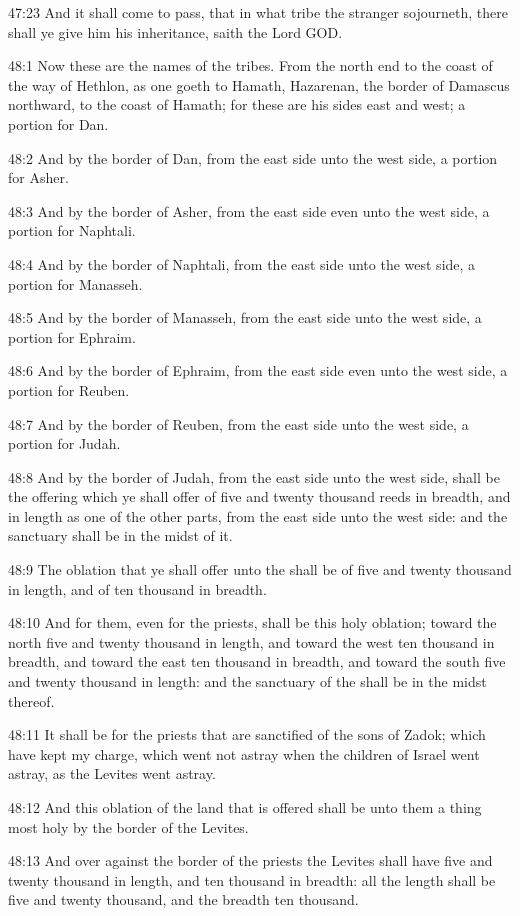 47:23 And it shall come to pass, that in what tribe the stranger sojourneth, there shall ye give him his inheritance, saith the Lord GOD.

48:1 Now these are the names of the tribes. From the north end to the coast of the way of Hethlon, as one goeth to Hamath, Hazarenan, the border of Damascus northward, to the coast of Hamath; for these are his sides east and west; a portion for Dan.

48:2 And by the border of Dan, from the east side unto the west side, a portion for Asher.

48:3 And by the border of Asher, from the east side even unto the west side, a portion for Naphtali.

48:4 And by the border of Naphtali, from the east side unto the west side, a portion for Manasseh.

48:5 And by the border of Manasseh, from the east side unto the west side, a portion for Ephraim.

48:6 And by the border of Ephraim, from the east side even unto the west side, a portion for Reuben.

48:7 And by the border of Reuben, from the east side unto the west side, a portion for Judah.

48:8 And by the border of Judah, from the east side unto the west side, shall be the offering which ye shall offer of five and twenty thousand reeds in breadth, and in length as one of the other parts, from the east side unto the west side: and the sanctuary shall be in the midst of it.

48:9 The oblation that ye shall offer unto the \LORD shall be of five and twenty thousand in length, and of ten thousand in breadth.

48:10 And for them, even for the priests, shall be this holy oblation; toward the north five and twenty thousand in length, and toward the west ten thousand in breadth, and toward the east ten thousand in breadth, and toward the south five and twenty thousand in length: and the sanctuary of the \LORD shall be in the midst thereof.

48:11 It shall be for the priests that are sanctified of the sons of Zadok; which have kept my charge, which went not astray when the children of Israel went astray, as the Levites went astray.

48:12 And this oblation of the land that is offered shall be unto them a thing most holy by the border of the Levites.

48:13 And over against the border of the priests the Levites shall have five and twenty thousand in length, and ten thousand in breadth: all the length shall be five and twenty thousand, and the breadth ten thousand.

